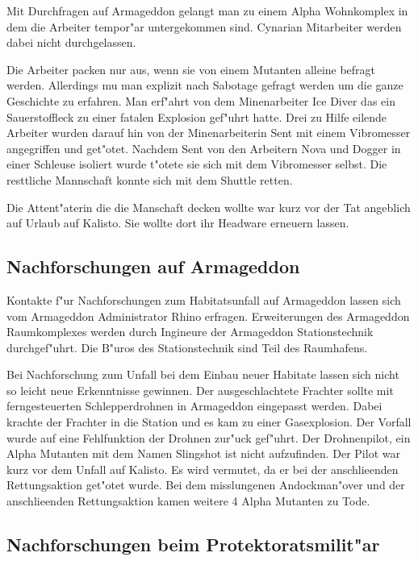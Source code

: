 Mit Durchfragen auf Armageddon gelangt man zu einem Alpha Wohnkomplex in dem die Arbeiter tempor"ar untergekommen sind. Cynarian Mitarbeiter werden dabei nicht durchgelassen.

Die Arbeiter packen nur aus, wenn sie von einem Mutanten alleine befragt werden. Allerdings mu\3 man explizit nach Sabotage gefragt werden um die ganze Geschichte zu erfahren. Man erf"ahrt von dem Minenarbeiter Ice Diver das ein Sauerstoffleck  zu einer fatalen Explosion gef"uhrt hatte. Drei zu Hilfe eilende Arbeiter wurden darauf hin von der Minenarbeiterin Sent mit einem Vibromesser angegriffen und get"otet. Nachdem Sent von den Arbeitern Nova und Dogger in einer Schleuse isoliert wurde t"otete sie sich mit dem Vibromesser selbst. Die resttliche Mannschaft konnte sich mit dem Shuttle retten.

Die Attent"aterin die die Manschaft decken wollte war kurz vor der Tat angeblich auf Urlaub auf Kalisto. Sie wollte
dort ihr Headware erneuern lassen.

\subsection{Nachforschungen auf Armageddon}

Kontakte f"ur Nachforschungen zum Habitatsunfall auf Armageddon lassen sich vom Armageddon Administrator Rhino erfragen. Erweiterungen des Armageddon Raumkomplexes werden durch Ingineure der Armageddon Stationstechnik durchgef"uhrt. Die B"uros des Stationstechnik sind Teil des Raumhafens.

Bei Nachforschung zum Unfall bei dem Einbau neuer Habitate lassen sich nicht so leicht neue Erkenntnisse gewinnen. Der
ausgeschlachtete Frachter sollte  mit ferngesteuerten Schlepperdrohnen in Armageddon eingepasst werden. Dabei krachte
der Frachter in die Station und es kam zu einer Gasexplosion. Der Vorfall wurde auf eine Fehlfunktion der Drohnen
zur"uck gef"uhrt. Der Drohnenpilot, ein Alpha Mutanten mit dem Namen Slingshot ist nicht aufzufinden. Der Pilot
war kurz vor dem Unfall auf Kalisto. Es wird  vermutet, da\3 er bei der anschlie\3enden Rettungsaktion get"otet wurde.
Bei dem misslungenen Andockman"over und der anschlie\3enden Rettungsaktion kamen weitere 4 Alpha Mutanten zu Tode.

\subsection{Nachforschungen beim Protektoratsmilit"ar}

